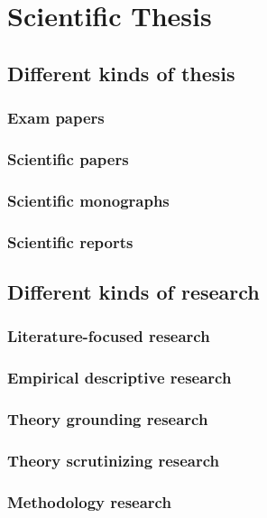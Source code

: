 \chapter{Scientific Thesis}

\lipsum[1]

\section{Different kinds of thesis}

\lipsum[2]

\subsection{Exam papers}

\lipsum[3]

\subsection{Scientific papers}

\lipsum[4]

\subsection{Scientific monographs}

\lipsum[5]

\subsection{Scientific reports}

\lipsum[6]

\section{Different kinds of research}

\lipsum[7]

\subsection{Literature-focused research}

\lipsum[8]

\subsection{Empirical descriptive research}

\lipsum[9]

\subsection{Theory grounding research}

\lipsum[10]

\subsection{Theory scrutinizing research}

\lipsum[11]

\subsection{Methodology research}

\lipsum[12]